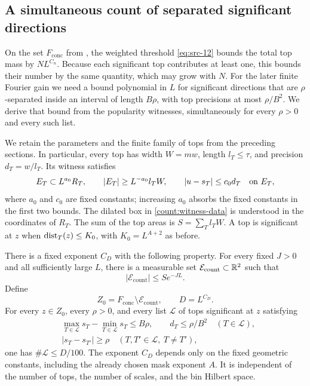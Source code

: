 \subsection{A simultaneous count of separated significant directions}
\label{count:section}

On the set $F_{\mathrm{conc}}$ from , the weighted
threshold \eqref{eq:src-12} bounds the total top mass by $NL^{C_n}$.
Because each significant top contributes at least one, this bounds their
number by the same quantity, which may grow with $N$.  For the later finite
Fourier gain we need a bound polynomial in $L$ for significant directions
that are $\rho$-separated inside an interval of length $B\rho$, with top
precisions at most $\rho/B^2$.  We derive that bound from the popularity
witnesses, simultaneously for every $\rho>0$ and every such list.

We retain the parameters and the finite family of tops from the preceding
sections.  In particular, every top has width $W=mw$, length
$l_T\leq\tau$, and precision $d_T=w/l_T$.  Its witness satisfies
\begin{equation}\label{count:witness-data}
 E_T\subset L^{a_0}R_T,\qquad
 |E_T|\geq L^{-a_0}l_TW,\qquad
 |u-s_T|\leq c_0d_T\quad\hbox{on }E_T,
\end{equation}
where $a_0$ and $c_0$ are fixed constants; increasing $a_0$ absorbs
the fixed constants in the first two bounds.  The dilated box in
\eqref{count:witness-data} is understood in the coordinates of $R_T$.
The sum of the top areas is $S=\sum_T l_TW$.  A top is significant at
$z$ when $\operatorname{dist}_T(z)\leq K_0$, with $K_0=L^{A+2}$ as before.

\begin{proposition}\label{count:simultaneous}
There is a fixed exponent $C_D$ with the following property.  For every
fixed $J>0$ and all sufficiently large $L$, there is a measurable set
$\mathcal E_{\mathrm{count}}\subset\mathbb R^2$ such that
\begin{equation}\label{count:exceptional-budget}
 |\mathcal E_{\mathrm{count}}|\leq S e^{-JL}.
\end{equation}
Define
\begin{equation}\label{count:good-set}
 Z_0=F_{\mathrm{conc}}\setminus\mathcal E_{\mathrm{count}},
 \qquad D=L^{C_D}.
\end{equation}
For every $z\in Z_0$, every $\rho>0$, and every list $\mathcal L$ of
tops significant at $z$ satisfying
\begin{equation}\label{count:list-hypotheses}
 \begin{split}
 &\max_{T\in\mathcal L}s_T-\min_{T\in\mathcal L}s_T\leq B\rho,
 \qquad d_T\leq\rho/B^2\quad(T\in\mathcal L),\\
 &|s_T-s_{T'}|\geq\rho\quad(T,T'\in\mathcal L,\ T\ne T'),
 \end{split}
\end{equation}
one has $\#\mathcal L\leq D/100$.
The exponent $C_D$ depends only on the fixed geometric constants,
including the already chosen mask exponent $A$.  It is independent of
the number of tops, the number of scales, and the bin Hilbert space.
\end{proposition}

